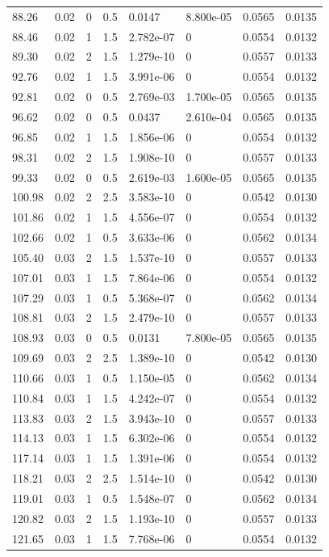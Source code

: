 \documentclass[preview]{standalone}
\begin{document}
{{\begin{tabular}{L{1.2cm}C{1.2cm} C{0.3cm}C{0.5cm} C{1.4cm}C{1.4cm} C{1.4cm}C{1.4cm}}
  88.26  &  0.02  & 0     & 0.5 &  0.0147  & 8.800e-05  & 0.0565 &  0.0135   \\ 
  88.46  &  0.02  & 1     & 1.5 &  2.782e-07  & 0  & 0.0554 &  0.0132   \\ 
  89.30  &  0.02  & 2     & 1.5 &  1.279e-10  & 0  & 0.0557 &  0.0133   \\ 
  92.76  &  0.02  & 1     & 1.5 &  3.991e-06  & 0  & 0.0554 &  0.0132   \\ 
  92.81  &  0.02  & 0     & 0.5 &  2.769e-03  & 1.700e-05  & 0.0565 &  0.0135   \\ 
  96.62  &  0.02  & 0     & 0.5 &  0.0437  & 2.610e-04  & 0.0565 &  0.0135   \\ 
  96.85  &  0.02  & 1     & 1.5 &  1.856e-06  & 0  & 0.0554 &  0.0132   \\ 
  98.31  &  0.02  & 2     & 1.5 &  1.908e-10  & 0  & 0.0557 &  0.0133   \\ 
  99.33  &  0.02  & 0     & 0.5 &  2.619e-03  & 1.600e-05  & 0.0565 &  0.0135   \\ 
  100.98  &  0.02  & 2     & 2.5 &  3.583e-10  & 0  & 0.0542 &  0.0130   \\ 
  101.86  &  0.02  & 1     & 1.5 &  4.556e-07  & 0  & 0.0554 &  0.0132   \\ 
  102.66  &  0.02  & 1     & 0.5 &  3.633e-06  & 0  & 0.0562 &  0.0134   \\ 
  105.40  &  0.03  & 2     & 1.5 &  1.537e-10  & 0  & 0.0557 &  0.0133   \\ 
  107.01  &  0.03  & 1     & 1.5 &  7.864e-06  & 0  & 0.0554 &  0.0132   \\ 
  107.29  &  0.03  & 1     & 0.5 &  5.368e-07  & 0  & 0.0562 &  0.0134   \\ 
  108.81  &  0.03  & 2     & 1.5 &  2.479e-10  & 0  & 0.0557 &  0.0133   \\ 
  108.93  &  0.03  & 0     & 0.5 &  0.0131  & 7.800e-05  & 0.0565 &  0.0135   \\ 
  109.69  &  0.03  & 2     & 2.5 &  1.389e-10  & 0  & 0.0542 &  0.0130   \\ 
  110.66  &  0.03  & 1     & 0.5 &  1.150e-05  & 0  & 0.0562 &  0.0134   \\ 
  110.84  &  0.03  & 1     & 1.5 &  4.242e-07  & 0  & 0.0554 &  0.0132   \\ 
  113.83  &  0.03  & 2     & 1.5 &  3.943e-10  & 0  & 0.0557 &  0.0133   \\ 
  114.13  &  0.03  & 1     & 1.5 &  6.302e-06  & 0  & 0.0554 &  0.0132   \\ 
  117.14  &  0.03  & 1     & 1.5 &  1.391e-06  & 0  & 0.0554 &  0.0132   \\ 
  118.21  &  0.03  & 2     & 2.5 &  1.514e-10  & 0  & 0.0542 &  0.0130   \\ 
  119.01  &  0.03  & 1     & 0.5 &  1.548e-07  & 0  & 0.0562 &  0.0134   \\ 
  120.82  &  0.03  & 2     & 1.5 &  1.193e-10  & 0  & 0.0557 &  0.0133   \\ 
  121.65  &  0.03  & 1     & 1.5 &  7.768e-06  & 0  & 0.0554 &  0.0132   \\ 
\hline 
\end{tabular} 

}}
\end{document}
